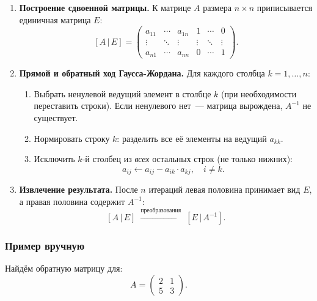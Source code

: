 \documentclass[12pt,a4paper]{scrartcl}
\begin{document}
\begin{enumerate}
    \item \textbf{Построение сдвоенной матрицы.}
          К матрице $A$ размера $n \times n$ приписывается единичная матрица $E$:
          \[
              [A\,|\,E] =
              \begin{pmatrix}
                  a_{11} & \cdots & a_{1n} & 1 & \cdots & 0 \\
                  \vdots & \ddots & \vdots & \vdots & \ddots & \vdots \\
                  a_{n1} & \cdots & a_{nn} & 0 & \cdots & 1
              \end{pmatrix}.
          \]

    \item \textbf{Прямой и обратный ход Гаусса-Жордана.}
          Для каждого столбца $k = 1, \ldots, n$:
          \begin{enumerate}
              \item Выбрать ненулевой ведущий элемент в столбце $k$
                    (при необходимости переставить строки).
                    Если ненулевого нет~--- матрица вырождена, $A^{-1}$ не существует.
              \item Нормировать строку $k$: разделить все её элементы на
                    ведущий $a_{kk}$.
              \item Исключить $k$-й столбец из \emph{всех} остальных строк
                    (не только нижних):
                    \[
                        a_{ij} \leftarrow a_{ij} - a_{ik} \cdot a_{kj},
                        \quad i \neq k.
                    \]
          \end{enumerate}

    \item \textbf{Извлечение результата.}
          После $n$ итераций левая половина принимает вид $E$,
          а правая половина содержит $A^{-1}$:
          \[
              [A\,|\,E] \;\xrightarrow{\text{преобразования}}\; [E\,|\,A^{-1}].
          \]
\end{enumerate}

\subsubsection{Пример вручную}

Найдём обратную матрицу для:
\[
    A =
    \begin{pmatrix}
        2 & 1 \\
        5 & 3
    \end{pmatrix}.
\]
\end{document}

